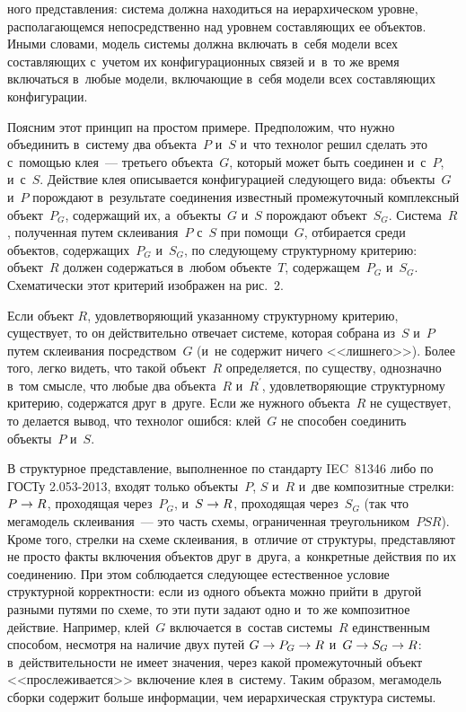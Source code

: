 \begin{multicols}{2}
\vspace*{18pt}

\addtocounter{figure}{1}

\noindent
ного представления: система должна находиться на иерархическом 
уровне, располагающемся непосредственно над уровнем со\-став\-ля\-ющих ее 
объектов. Иными словами, модель системы должна включать в~себя модели 
всех составляющих с~учетом их конфигурационных связей и~в~то же время 
включаться в~любые модели, включающие в~себя модели всех составляющих 
конфигурации.
   
   Поясним этот принцип на простом примере. Предположим, что нужно 
объединить в~систему два объекта~$P$ и~$S$ и~что технолог решил сделать это 
с~по\-мощью клея~--- третьего объекта~$G$, который может быть соединен 
и~с~$P$, и~с~$S$. Действие клея описывается конфигурацией следующего 
вида: объекты~$G$ и~$P$ порождают в~результате соединения известный 
промежуточный комплексный объект~$P_G$, содержащий их, а~объекты~$G$ 
и~$S$ порождают объект~$S_G$. Система~$R$, полученная путем 
склеивания~$P$ с~$S$ при помощи~$G$, отбирается среди объектов, 
содержащих~$P_G$ и~$S_G$, по следующему структурному критерию: 
объект~$R$ должен содержаться в~любом объекте~$T$, содержащем~$P_G$ 
и~$S_G$. Схематически этот критерий изображен на рис.~2.


   Если объект $R$, удовлетворяющий указанному структурному критерию, 
существует, то он действительно отвечает системе, которая собрана из~$S$ 
и~$P$ путем склеивания посредством~$G$ (и~не содержит ничего 
<<лишнего>>). Более того, легко видеть, что такой объект~$R$ определяется, 
по существу, однозначно в~том смысле, что любые два объекта~$R$ 
и~$R^\prime$, удовлетворяющие структурному критерию, содержатся друг 
в~друге. Если же нужного объекта~$R$ не существует, то делается вывод, что 
технолог ошибся: клей~$G$ не способен соединить объекты~$P$ и~$S$.
   
   В структурное представление, выполненное по стандарту IEC~81346 либо по 
ГОСТу 2.053-2013, входят только объекты~$P$, $S$ и~$R$ и~две композитные 
стрелки: $P\hm\to R$, проходящая через~$P_G$, и~$S\hm\to R$, проходящая 
через~$S_G$ (так что мегамодель склеивания~--- это часть схемы, ограниченная 
треугольником~$PSR$). Кроме того, стрелки на схеме склеивания, в~отличие от 
структуры, представляют не просто факты включения объектов друг в~друга, 
а~конкретные действия по их соединению. При этом соблюдается следующее 
естественное условие структурной корректности: если из одного объекта 
можно прийти в~другой разными путями по схеме, то эти пути задают одно и~то 
же композитное действие. Например, клей~$G$ включается в~состав 
системы~$R$ единственным способом, несмотря на наличие двух путей $G 
\hm\to  P_G \hm\to R$ и~$G \hm\to S_G \hm\to R$: в~действительности не имеет 
значения, через какой промежуточный объект <<прослеживается>> включение 
клея в~систему. Таким образом, мегамодель сборки содержит больше 
информации, чем иерархическая структура системы.
   

\end{multicols}
